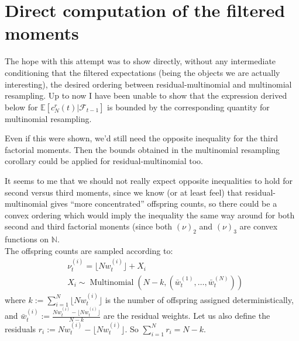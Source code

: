 \documentclass{article}
\newcommand{\E}{\mathbb{E}}
\newcommand{\1}[1]{\mathbbm{1}_{#1}}
\newcommand{\wbar}[2][t]{\bar{w}_{#1}^{(#2)}}
\newcommand{\Mn}{\operatorname{Multinomial}}
\begin{document}
\section{Direct computation of the filtered moments}

The hope with this attempt was to show directly, without any intermediate conditioning that the filtered expectations (being the objects we are actually interesting), the desired ordering between residual-multinomial and multinomial resampling. Up to now I have been unable to show that the expression derived below for $\E[c^r_N(t) |\mathcal{F}_{t-1}]$ is bounded by the corresponding quantity for multinomial resampling. 

Even if this were shown, we'd still need the opposite inequality for the third factorial moments. Then the bounds obtained in the multinomial resampling corollary could be applied for residual-multinomial too. 

It seems to me that we should not really expect opposite inequalities to hold for second versus third moments, since we know (or at least feel) that residual-multinomial gives ``more concentrated'' offspring counts, so there could be a convex ordering which would imply the inequality the same way around for both second and third factorial monents (since both $(\nu)_2$ and $(\nu)_3$ are convex functions on $\mathbb{N}$.\\




The offspring counts are sampled according to:
\begin{align*}
& \nu_t^{(i)} = \lfloor N w_t^{(i)} \rfloor + X_i \\
& X_i \sim \Mn (N-k, (\wbar{1}, \dots, \wbar{N}))
\end{align*}
where $k := \sum_{i=1}^N \lfloor N w_t^{(i)} \rfloor$ is the number of offspring assigned deterministically, and $\wbar{i} := \frac{Nw_t^{(i)} - \lfloor N w_t^{(i)} \rfloor}{N - k}$ are the residual weights. Let us also define the residuals $r_i := Nw_t^{(i)} - \lfloor N w_t^{(i)} \rfloor$. So $\sum_{i=1}^N r_i = N-k$.
\end{document}
